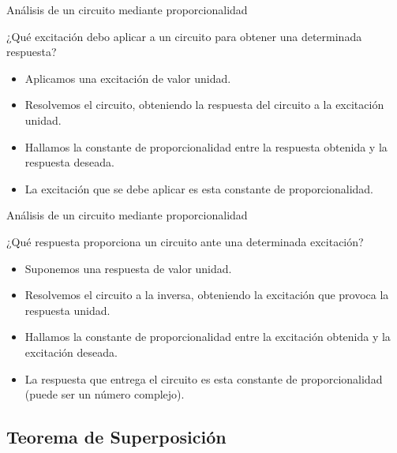 \documentclass[aspectratio=169, usenames,svgnames,dvipsnames]{beamer}
\begin{document}
\begin{frame}[label={sec:orga739076}]{Análisis de un circuito mediante proporcionalidad}
\begin{block}{¿Qué excitación debo aplicar a un circuito para obtener una determinada respuesta?}
\begin{itemize}
\item Aplicamos una excitación de valor unidad.
\item Resolvemos el circuito, obteniendo la respuesta del circuito a la excitación unidad.
\item Hallamos la constante de proporcionalidad entre la respuesta obtenida y la respuesta deseada.
\item La excitación que se debe aplicar es esta constante de proporcionalidad.
\end{itemize}
\end{block}
\end{frame}

\begin{frame}[label={sec:org73e9003}]{Análisis de un circuito mediante proporcionalidad}
\begin{block}{¿Qué respuesta proporciona un circuito ante una determinada excitación?}
\begin{itemize}
\item Suponemos una respuesta de valor unidad.
\item Resolvemos el circuito a la inversa, obteniendo la excitación que provoca la respuesta unidad.
\item Hallamos la constante de proporcionalidad entre la excitación obtenida y la excitación deseada.
\item La respuesta que entrega el circuito es esta constante de proporcionalidad (puede ser un número complejo).
\end{itemize}
\end{block}
\end{frame}

\subsection{Teorema de Superposición}
\label{sec:org4f86195}
\end{document}
